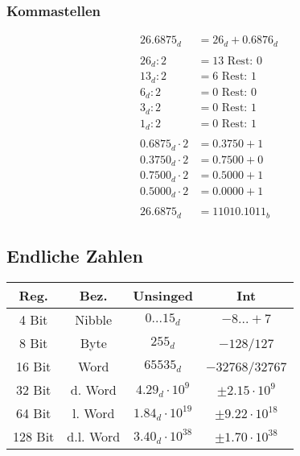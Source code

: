 \begin{minipage}[t]{0.45\linewidth}
\subsubsection*{Kommastellen}
	\begin{align*}
		26.6875_d &= 26_d + 0.6876_d \\
		\\
		26_d : 2 &= 13 \text{ Rest: } 0 \\
		13_d : 2 &= 6 \text{ Rest: } 1 \\
		6_d : 2 &= 0 \text{ Rest: } 0 \\
		3_d : 2 &= 0 \text{ Rest: } 1 \\
		1_d : 2 &= 0 \text{ Rest: } 1 \\
		\\
		0.6875_d \cdot 2 &= 0.3750 + 1 \\
		0.3750_d \cdot 2 &= 0.7500 + 0 \\
		0.7500_d \cdot 2 &= 0.5000 + 1 \\
		0.5000_d \cdot 2 &= 0.0000 + 1 \\
		\\
		26.6875_d &= 11010.1011_b
	\end{align*}
\end{minipage}

\subsection{Endliche Zahlen}
\begin{tabular}{| c | c | c | c |}
	\hline
	Reg. & Bez. & Unsinged & Int \\
	\hline
	\hline
	4 Bit & Nibble & $0 ... 15_d$ & $-8 ... +7$ \\
	\hline
	8 Bit & Byte & $255_d$ & $-128$/$127$ \\
	\hline
	16 Bit & Word & $65535_d$ & $-32768$/$32767$ \\
	\hline
	32 Bit & d. Word & $4.29_d \cdot 10^9$ & $\pm 2.15 \cdot 10^9$ \\
	\hline
	64 Bit & l. Word & $1.84_d \cdot 10^{19}$ & $\pm 9.22 \cdot 10^{18}$ \\
	\hline
	128 Bit & d.l. Word & $3.40_d \cdot 10^{38}$ & $\pm 1.70 \cdot 10^{38}$ \\
	\hline
\end{tabular}


